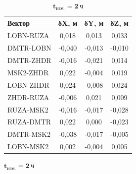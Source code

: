 \begin{table} [htbp]
	\centering\small
	\label{tab:tab47}{
		\begin{subtable}{.47\linewidth}	
			\centering
			\caption*{$\mathbf{t_\text{изм.}=1\,\text{ч}}$}
			\begin{tabular}{ l
					S[table-number-alignment = center]
					S[table-number-alignment = center]
					S[table-number-alignment = center] }
				
				
				\hline
				\textbf{Вектор}				& \textbf{δX, м}	& \textbf{δY, м}	& \textbf{δZ, м}	\\ \hline
				LOBN-RUZA					&      0,018		& 	   0,013		&      0,033		\\ %
				DMTR-LOBN					&     -0,040		&     -0,013		&     -0,010		\\ %
				DMTR-ZHDR					&     -0,016		&     -0,021		&      0,014		\\ %
				MSK2-ZHDR					&      0,022		&     -0,004		&      0,019		\\ %
				LOBN-ZHDR					&      0,024		&     -0,008		&      0,024		\\ %
				ZHDR-RUZA					&     -0,006		&      0,021		&      0,009		\\ %
				RUZA-MSK2					&     -0,016		&     -0,017		&     -0,028		\\ %
				RUZA-DMTR					&      0,022		&      0,000		&     -0,023		\\ %
				DMTR-MSK2					&     -0,038		&     -0,017		&     -0,005		\\ %
				LOBN-MSK2					&      0,002		&     -0,004		&      0,005		\\ \hline
				
			\end{tabular}
		\end{subtable}%
		\qquad%
		\begin{subtable}{.47\linewidth}	
			\centering
			\caption*{$\mathbf{t_\text{изм.}=2\,\text{ч}}$}
			\begin{tabular}{ l
					S[table-number-alignment = center]
					S[table-number-alignment = center]
					S[table-number-alignment = center] }
				

\end{tabular}
\end{subtable}}
\end{table}
